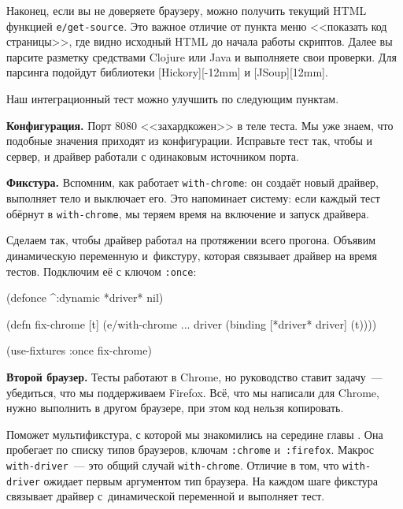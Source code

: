 Наконец, если вы не доверяете браузеру, можно получить текущий HTML функцией
\verb|e/get-source|. Это важное отличие от пункта меню <<показать код
страницы>>, где видно исходный HTML до начала работы скриптов. Далее вы парсите
разметку средствами Clojure или Java и выполняете свои проверки. Для парсинга
подойдут библиотеки
[Hickory][-12mm] и
[JSoup][12mm].


Наш интеграционный тест можно улучшить по следующим пунктам.

\textbf{Конфигурация.} Порт 8080 <<захардкожен>> в теле теста. Мы уже знаем, что
подобные значения приходят из конфигурации. Исправьте тест так, чтобы и сервер,
и драйвер работали с одинаковым источником порта.


\textbf{Фикстура.} Вспомним, как работает \texttt{with\--chrome}: он создаёт новый
драйвер, выполняет тело и выключает его. Это напоминает систему: если каждый
тест обёрнут в \verb|with-chrome|, мы теряем время на включение и запуск
драйвера.

Сделаем так, чтобы драйвер работал на протяжении всего прогона. Объявим
динамическую переменную и~фикстуру, которая связывает драйвер на время
тестов. Подключим её с ключом \verb|:once|:

\begin{english}
  \begin{clojure}
(defonce ^:dynamic *driver* nil)

(defn fix-chrome [t]
  (e/with-chrome {...} driver
    (binding [*driver* driver]
      (t))))

(use-fixtures :once fix-chrome)
  \end{clojure}
\end{english}

\textbf{Второй браузер.} Тесты работают в Chro\-me, но руководство ставит
задачу~--- убедиться, что мы поддерживаем Firefox. Всё, что мы написали для
Chrome, нужно выполнить в другом браузере, при этом код нельзя копировать.

Поможет мультификстура, с которой мы знакомились на середине
главы . Она пробегает по списку типов браузеров, ключам
\verb|:chrome| и~\verb|:firefox|. Макрос \verb|with-driver|~--- это общий случай
\verb|with-chrome|. Отличие в том, что \verb|with-driver| ожидает первым
аргументом тип браузера. На каждом шаге фикстура связывает драйвер
с~динамической переменной и выполняет тест.

